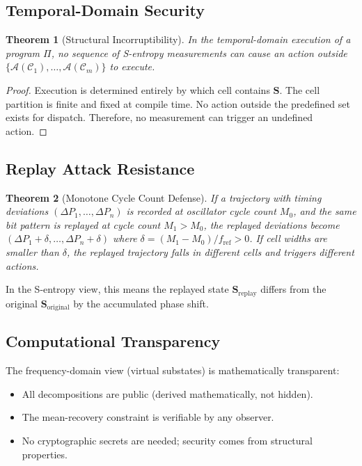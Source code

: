 \documentclass[twocolumn,11pt,a4paper]{article}
\newtheorem{theorem}{Theorem}[section]
\newcommand{\DP}{\Delta P}
\newcommand{\Stuple}{\mathbf{S}}
\newcommand{\calC}{\mathcal{C}}
\newcommand{\fref}{f_{\mathrm{ref}}}
\begin{document}
\subsection{Temporal-Domain Security}

\begin{theorem}[Structural Incorruptibility]
In the temporal-domain execution of a program $\Pi$, no sequence of S-entropy measurements can cause an action outside $\{\mathcal{A}(\calC_1), \ldots, \mathcal{A}(\calC_m)\}$ to execute.
\end{theorem}

\begin{proof}
Execution is determined entirely by which cell contains $\Stuple$. The cell partition is finite and fixed at compile time. No action outside the predefined set exists for dispatch. Therefore, no measurement can trigger an undefined action.
\end{proof}

\subsection{Replay Attack Resistance}

\begin{theorem}[Monotone Cycle Count Defense]
If a trajectory with timing deviations $(\DP_1, \ldots, \DP_n)$ is recorded at oscillator cycle count $M_0$, and the same bit pattern is replayed at cycle count $M_1 > M_0$, the replayed deviations become $(\DP_1 + \delta, \ldots, \DP_n + \delta)$ where $\delta = (M_1 - M_0)/\fref > 0$. If cell widths are smaller than $\delta$, the replayed trajectory falls in different cells and triggers different actions.
\end{theorem}

In the S-entropy view, this means the replayed state $\Stuple_{\text{replay}}$ differs from the original $\Stuple_{\text{original}}$ by the accumulated phase shift.

\subsection{Computational Transparency}

The frequency-domain view (virtual substates) is mathematically transparent:
\begin{itemize}[nosep,leftmargin=1em]
  \item All decompositions are public (derived mathematically, not hidden).
  \item The mean-recovery constraint is verifiable by any observer.
  \item No cryptographic secrets are needed; security comes from structural properties.
\end{itemize}
\end{document}
